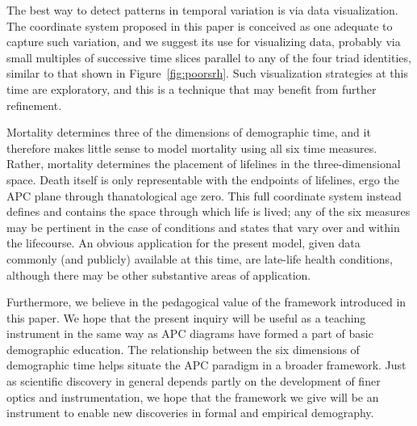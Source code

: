 \documentclass[12pt,oneside,a4paper]{article} %
\begin{document}
The best way to detect patterns in temporal variation
is via data visualization. The coordinate system proposed in this paper is
conceived as one adequate to capture such variation, and we suggest its use
for visualizing data, probably via small multiples of successive time slices
parallel to any of the four triad identities, similar to that shown in
Figure~\ref{fig:poorsrh}.
Such visualization strategies at this time are exploratory, and this is a
technique that may benefit from further refinement. 

Mortality determines three of the dimensions of
demographic time, and it therefore makes little sense to model mortality using
all six time measures. Rather, mortality determines the placement of
lifelines in the three-dimensional space. Death itself is only representable
with the endpoints of lifelines, ergo the APC plane through thanatological age
zero. This full coordinate system instead defines and contains the space through
which life is lived; any of the six measures may be pertinent in the case of
conditions and states that vary over and within the lifecourse. An obvious
application for the present model, given data commonly (and publicly) available at this time, are late-life health conditions, although there may be other substantive areas of application. 

Furthermore, we believe in the pedagogical value of the framework
introduced in this paper. We hope that the
present inquiry will be useful as a teaching instrument in the same way as APC
diagrams have formed a part of basic demographic education.
The relationship between the six dimensions of demographic time helps situate the APC
paradigm in a broader framework. Just as scientific discovery in general
depends partly on the development of finer optics and instrumentation, we hope
that the framework we give will be an instrument to enable new discoveries
in formal and empirical demography.


\end{document}
